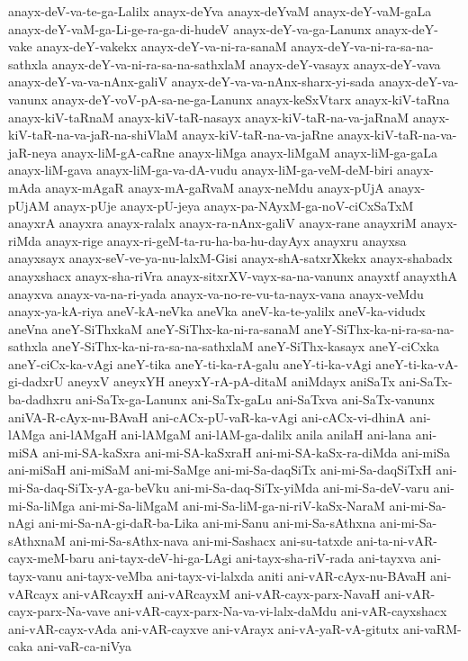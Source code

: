 {anayx-deV-va-te-ga-Lalilx
anayx-deYva
anayx-deYvaM
anayx-deY-vaM-gaLa
anayx-deY-vaM-ga-Li-ge-ra-ga-di-hudeV
anayx-deY-va-ga-Lanunx
anayx-deY-vake
anayx-deY-vakekx
anayx-deY-va-ni-ra-sanaM
anayx-deY-va-ni-ra-sa-na-sathxla
anayx-deY-va-ni-ra-sa-na-sathxlaM
anayx-deY-vasayx
anayx-deY-vava
anayx-deY-va-va-nAnx-galiV
anayx-deY-va-va-nAnx-sharx-yi-sada
anayx-deY-va-vanunx
anayx-deY-voV-pA-sa-ne-ga-Lanunx
anayx-keSxVtarx
anayx-kiV-taRna
anayx-kiV-taRnaM
anayx-kiV-taR-nasayx
anayx-kiV-taR-na-va-jaRnaM
anayx-kiV-taR-na-va-jaR-na-shiVlaM
anayx-kiV-taR-na-va-jaRne
anayx-kiV-taR-na-va-jaR-neya
anayx-liM-gA-caRne
anayx-liMga
anayx-liMgaM
anayx-liM-ga-gaLa
anayx-liM-gava
anayx-liM-ga-va-dA-vudu
anayx-liM-ga-veM-deM-biri
anayx-mAda
anayx-mAgaR
anayx-mA-gaRvaM
anayx-neMdu
anayx-pUjA
anayx-pUjAM
anayx-pUje
anayx-pU-jeya
anayx-pa-NAyxM-ga-noV-ciCxSaTxM
anayxrA
anayxra
anayx-ralalx
anayx-ra-nAnx-galiV
anayx-rane
anayxriM
anayx-riMda
anayx-rige
anayx-ri-geM-ta-ru-ha-ba-hu-dayAyx
anayxru
anayxsa
anayxsayx
anayx-seV-ve-ya-nu-lalxM-Gisi
anayx-shA-satxrXkekx
anayx-shabadx
anayxshacx
anayx-sha-riVra
anayx-sitxrXV-vayx-sa-na-vanunx
anayxtf
anayxthA
anayxva
anayx-va-na-ri-yada
anayx-va-no-re-vu-ta-nayx-vana
anayx-veMdu
anayx-ya-kA-riya
aneV-kA-neVka
aneVka
aneV-ka-te-yalilx
aneV-ka-vidudx
aneVna
aneY-SiThxkaM
aneY-SiThx-ka-ni-ra-sanaM
aneY-SiThx-ka-ni-ra-sa-na-sathxla
aneY-SiThx-ka-ni-ra-sa-na-sathxlaM
aneY-SiThx-kasayx
aneY-ciCxka
aneY-ciCx-ka-vAgi
aneY-tika
aneY-ti-ka-rA-galu
aneY-ti-ka-vAgi
aneY-ti-ka-vA-gi-dadxrU
aneyxV
aneyxYH
aneyxY-rA-pA-ditaM
aniMdayx
aniSaTx
ani-SaTx-ba-dadhxru
ani-SaTx-ga-Lanunx
ani-SaTx-gaLu
ani-SaTxva
ani-SaTx-vanunx
aniVA-R-cAyx-nu-BAvaH
ani-cACx-pU-vaR-ka-vAgi
ani-cACx-vi-dhinA
ani-lAMga
ani-lAMgaH
ani-lAMgaM
ani-lAM-ga-dalilx
anila
anilaH
ani-lana
ani-miSA
ani-mi-SA-kaSxra
ani-mi-SA-kaSxraH
ani-mi-SA-kaSx-ra-diMda
ani-miSa
ani-miSaH
ani-miSaM
ani-mi-SaMge
ani-mi-Sa-daqSiTx
ani-mi-Sa-daqSiTxH
ani-mi-Sa-daq-SiTx-yA-ga-beVku
ani-mi-Sa-daq-SiTx-yiMda
ani-mi-Sa-deV-varu
ani-mi-Sa-liMga
ani-mi-Sa-liMgaM
ani-mi-Sa-liM-ga-ni-riV-kaSx-NaraM
ani-mi-Sa-nAgi
ani-mi-Sa-nA-gi-daR-ba-Lika
ani-mi-Sanu
ani-mi-Sa-sAthxna
ani-mi-Sa-sAthxnaM
ani-mi-Sa-sAthx-nava
ani-mi-Sashacx
ani-su-tatxde
ani-ta-ni-vAR-cayx-meM-baru
ani-tayx-deV-hi-ga-LAgi
ani-tayx-sha-riV-rada
ani-tayxva
ani-tayx-vanu
ani-tayx-veMba
ani-tayx-vi-lalxda
aniti
ani-vAR-cAyx-nu-BAvaH
ani-vARcayx
ani-vARcayxH
ani-vARcayxM
ani-vAR-cayx-parx-NavaH
ani-vAR-cayx-parx-Na-vave
ani-vAR-cayx-parx-Na-va-vi-lalx-daMdu
ani-vAR-cayxshacx
ani-vAR-cayx-vAda
ani-vAR-cayxve
ani-vArayx
ani-vA-yaR-vA-gitutx
ani-vaRM-caka
ani-vaR-ca-niVya
}
